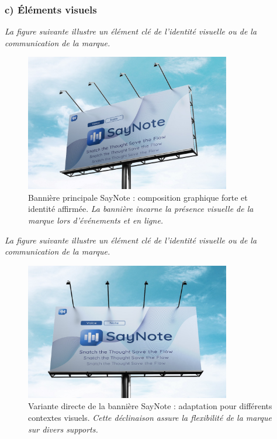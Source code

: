 \subsubsection*{c) Éléments visuels}
\noindent
\textit{La figure suivante illustre un élément clé de l'identité visuelle ou de la communication de la marque.}
\begin{figure}[H]
    \centering
    \includegraphics[width=0.8\textwidth]{docs/visual-indentity/pictures/big-banner.jpg}
    \caption{Bannière principale SayNote : composition graphique forte et identité affirmée. \newline\textit{La bannière incarne la présence visuelle de la marque lors d'événements et en ligne.}}
\end{figure}
\noindent
\textit{La figure suivante illustre un élément clé de l'identité visuelle ou de la communication de la marque.}
\begin{figure}[H]
    \centering
    \includegraphics[width=0.8\textwidth]{docs/visual-indentity/pictures/big-banner-directly .jpg}
    \caption{Variante directe de la bannière SayNote : adaptation pour différents contextes visuels. \newline\textit{Cette déclinaison assure la flexibilité de la marque sur divers supports.}}
\end{figure}

